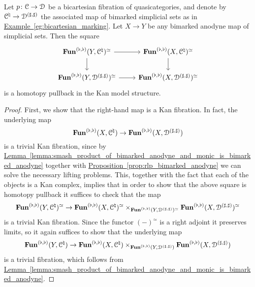 \documentclass[main.tex]{subfiles}
\begin{document}
\begin{proposition}
  \label{proposition:bimarked_anodyne_homotopy_pullback}
  Let $p\colon \mathcal{C} \to \mathcal{D}$ be a bicartesian fibration of quasicategories, and denote by $\mathcal{C}^{\natural} \to \mathcal{D}^{(\sharp, \sharp)}$ the associated map of bimarked simplicial sets as in \hyperref[eg:bicartesian_marking]{Example~\ref*{eg:bicartesian_marking}}. Let $X \to Y$ be any bimarked anodyne map of simplicial sets. Then the square
  \begin{equation*}
    \begin{tikzcd}
      \Fun^{(\flat, \flat)}(Y, \category{C}\nat)^{\simeq}
      \arrow[r]
      \arrow[d]
      & \Fun^{(\flat, \flat)}(X, \category{C}\nat)^{\simeq}
      \arrow[d]
      \\
      \Fun^{(\flat, \flat)}(Y, \category{D}^{(\sharp, \sharp)})^{\simeq}
      \arrow[r]
      & \Fun^{(\flat, \flat)}(X, \category{D}^{(\sharp, \sharp)})^{\simeq}
    \end{tikzcd}
  \end{equation*}
  is a homotopy pullback in the Kan model structure.
\end{proposition}
\begin{proof}
  First, we show that the right-hand map is a Kan fibration. In fact, the underlying map
  \begin{equation*}
    \mathbf{Fun}^{(\flat, \flat)}(X, \mathcal{C}^{\natural}) \to \mathbf{Fun}^{(\flat, \flat)}(X, \mathcal{D}^{(\sharp, \sharp)})
  \end{equation*}
  is a trivial Kan fibration, since by \hyperref[lemma:smash_product_of_bimarked_anodyne_and_monic_is_bimarked_anodyne]{Lemma~\ref*{lemma:smash_product_of_bimarked_anodyne_and_monic_is_bimarked_anodyne}} together with \hyperref[prop:rlp_bimarked_anodyne]{Proposition~\ref*{prop:rlp_bimarked_anodyne}} we can solve the necessary lifting problems. This, together with the fact that each of the objects is a Kan complex, implies that in order to show that the above square is homotopy pullback it suffices to check that the map
  \begin{equation*}
    \mathbf{Fun}^{(\flat, \flat)}(Y, \mathcal{C}^{\natural})^{\simeq} \to \mathbf{Fun}^{(\flat, \flat)}(X, \mathcal{C}^{\natural})^{\simeq} \times_{\mathbf{Fun}^{(\flat, \flat)}(Y, \mathcal{D}^{(\sharp, \sharp)})^{\simeq}} \mathbf{Fun}^{(\flat, \flat)}(X, \mathcal{D}^{(\sharp, \sharp)})^{\simeq}
  \end{equation*}
  is a trivial Kan fibration. Since the functor $(-)^{\simeq}$ is a right adjoint it preserves limits, so it again suffices to show that the underlying map
  \begin{equation*}
    \mathbf{Fun}^{(\flat, \flat)}(Y, \mathcal{C}^{\natural}) \to \mathbf{Fun}^{(\flat, \flat)}(X, \mathcal{C}^{\natural}) \times_{\mathbf{Fun}^{(\flat, \flat)}(Y, \mathcal{D}^{(\sharp, \sharp)})} \mathbf{Fun}^{(\flat, \flat)}(X, \mathcal{D}^{(\sharp, \sharp)})
  \end{equation*}
  is a trivial fibration, which follows from \hyperref[lemma:smash_product_of_bimarked_anodyne_and_monic_is_bimarked_anodyne]{Lemma~\ref*{lemma:smash_product_of_bimarked_anodyne_and_monic_is_bimarked_anodyne}}.
\end{proof}
\end{document}
